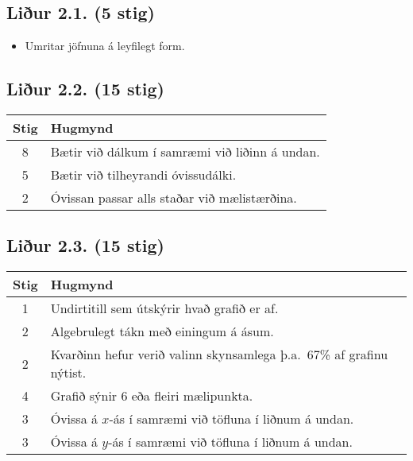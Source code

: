 \begin{tcolorbox}
\subsection*{Liður 2.1. (5 stig)}

\begin{itemize}
    \item Umritar jöfnuna á leyfilegt form.
\end{itemize}

\subsection*{Liður 2.2. (15 stig)}

\begin{table}[H]
    \centering
    \begin{tabular}{|c|l|}
    \hline
       \textbf{Stig}  & \textbf{Hugmynd}   \\ \hline \hline
        8  & Bætir við dálkum í samræmi við liðinn á undan. \\ \hline
        5  & Bætir við tilheyrandi óvissudálki.  \\ \hline
        2  & Óvissan passar alls staðar við mælistærðina. \\ \hline
    \end{tabular}
\end{table}


\subsection*{Liður 2.3. (15 stig)}

\begin{table}[H]
    \centering
    \begin{tabular}{|c|l|}
    \hline
       \textbf{Stig}  & \textbf{Hugmynd}   \\ \hline \hline
         1  & Undirtitill sem útskýrir hvað grafið er af. \\ \hline
        2  & Algebrulegt tákn með einingum á ásum. \\ \hline
        2  & Kvarðinn hefur verið valinn skynsamlega þ.a.~67\% af grafinu nýtist. \\ \hline
        4  & Grafið sýnir 6 eða fleiri mælipunkta. \\ \hline
        3  & Óvissa á $x$-ás í samræmi við töfluna í liðnum á undan. \\ \hline
        3  & Óvissa á $y$-ás í samræmi við töfluna í liðnum á undan. \\ \hline
    \end{tabular}
\end{table}

\end{tcolorbox}

